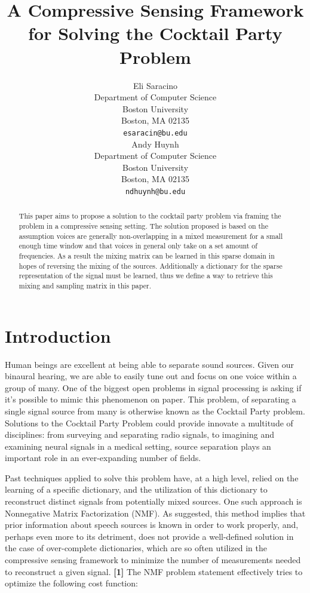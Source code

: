 \documentclass{article}
\title{A Compressive Sensing Framework for Solving the Cocktail Party Problem}
\author{
  Eli Saracino \\
  Department of Computer Science\\
  Boston University\\
  Boston, MA 02135 \\
  \texttt{esaracin@bu.edu} \\
  \And
  Andy Huynh \\
  Department of Computer Science \\
  Boston University \\
  Boston, MA 02135 \\
  \texttt{ndhuynh@bu.edu} \\
}
\begin{document}
\maketitle

\begin{abstract}
    This paper aims to propose a solution to the cocktail party problem via framing the problem in a compressive sensing setting. The solution proposed is based on the assumption voices are generally non-overlapping in a mixed measurement for a small enough time window and that voices in general only take on a set amount of frequencies. As a result the mixing matrix can be learned in this sparse domain in hopes of reversing the mixing of the sources. Additionally a dictionary for the sparse representation of the signal must be learned, thus we define a way to retrieve this mixing and sampling matrix in this paper.
\end{abstract}

\section{Introduction}
Human beings are excellent at being able to separate sound sources. Given our binaural hearing, we are able to easily tune out and focus on one voice within a group of many. One of the biggest open problems in signal processing is asking if it's possible to mimic this phenomenon on paper. This problem, of separating a single signal source from many is otherwise known as the Cocktail Party problem. Solutions to the Cocktail Party Problem could provide innovate a multitude of disciplines: from surveying and separating radio signals, to imagining and examining neural signals in a medical setting, source separation plays an important role in an ever-expanding number of fields. 

Past techniques applied to solve this problem have, at a high level, relied on the learning of a specific dictionary, and the utilization of this dictionary to reconstruct distinct signals from potentially mixed sources. One such approach is Nonnegative Matrix Factorization (NMF). As suggested, this method implies that prior information about speech sources is known in order to work properly, and, perhaps even more to its detriment, does not provide a well-defined solution in the case of over-complete dictionaries, which are so often utilized in the compressive sensing framework to minimize the number of measurements needed to reconstruct a given signal. \textbf{[1]} The NMF problem statement effectively tries to optimize the following cost function: 
\end{document}

